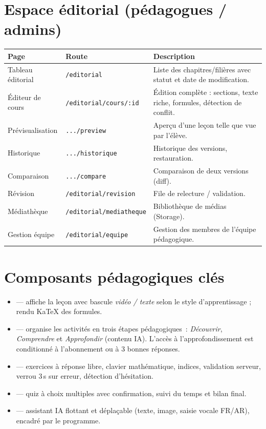 \section{Espace éditorial (pédagogues / admins)}
\begin{longtable}{p{3.6cm}p{3.8cm}p{6.8cm}}
\toprule \textbf{Page} & \textbf{Route} & \textbf{Description} \\ \midrule \endhead
Tableau éditorial & \texttt{/editorial} & Liste des chapitres/filières avec statut et date de modification. \\
Éditeur de cours & \texttt{/editorial/cours/:id} & Édition complète : sections, texte riche, formules, détection de conflit. \\
Prévisualisation & \texttt{.../preview} & Aperçu d'une leçon telle que vue par l'élève. \\
Historique & \texttt{.../historique} & Historique des versions, restauration. \\
Comparaison & \texttt{.../compare} & Comparaison de deux versions (diff). \\
Révision & \texttt{/editorial/revision} & File de relecture / validation. \\
Médiathèque & \texttt{/editorial/mediatheque} & Bibliothèque de médias (Storage). \\
Gestion équipe & \texttt{/editorial/equipe} & Gestion des membres de l'équipe pédagogique. \\
\bottomrule
\end{longtable}

\section{Composants pédagogiques clés}
\begin{itemize}
  \item {} --- affiche la leçon avec bascule \emph{vidéo / texte}
        selon le style d'apprentissage ; rendu KaTeX des formules.
  \item {} --- organise les activités en trois étapes
        pédagogiques~: \emph{Découvrir}, \emph{Comprendre} et \emph{Approfondir}
        (contenu IA). L'accès à l'approfondissement est conditionné
        à l'abonnement ou à 3 bonnes réponses.
  \item {} --- exercices à réponse libre, clavier
        mathématique, indices, validation serveur, verrou 3\,s sur erreur,
        détection d'hésitation.
  \item {} --- quiz à choix multiples avec confirmation,
        suivi du temps et bilan final.
  \item {} --- assistant IA flottant et déplaçable (texte, image,
        saisie vocale FR/AR), encadré par le programme.
\end{itemize}


